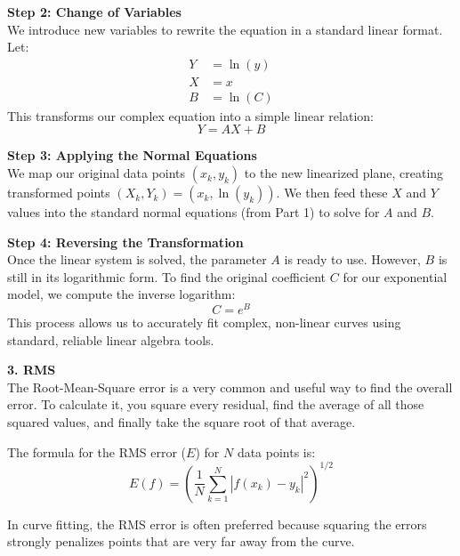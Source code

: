 \vspace{5pt}
\noindent\textbf{Step 2: Change of Variables} \\
We introduce new variables to rewrite the equation in a standard linear format. Let:
\begin{align*}
    Y &= \ln(y) \\
    X &= x \\
    B &= \ln(C)
\end{align*}
This transforms our complex equation into a simple linear relation:
\begin{equation*}
    Y = AX + B
\end{equation*}

\vspace{5pt}
\noindent\textbf{Step 3: Applying the Normal Equations} \\
We map our original data points $(x_k, y_k)$ to the new linearized plane, creating transformed points $(X_k, Y_k) = (x_k, \ln(y_k))$. We then feed these $X$ and $Y$ values into the standard normal equations (from Part 1) to solve for $A$ and $B$.

\vspace{5pt}
\noindent\textbf{Step 4: Reversing the Transformation} \\
Once the linear system is solved, the parameter $A$ is ready to use. However, $B$ is still in its logarithmic form. To find the original coefficient $C$ for our exponential model, we compute the inverse logarithm:
\begin{equation*}
    C = e^B
\end{equation*}
This process allows us to accurately fit complex, non-linear curves using standard, reliable linear algebra tools.

\vspace{5pt}
\noindent\textbf{3. RMS} \cite[page 253]{MathewsFink2003} \\
The Root-Mean-Square error is a very common and useful way to find the overall error. To calculate it, you square every residual, find the average of all those squared values, and finally take the square root of that average.

The formula for the RMS error ($E$) for $N$ data points is:
\begin{equation}
    E(f) = \left( \frac{1}{N} \sum_{k=1}^{N} |f(x_k) - y_k|^2 \right)^{1/2}
\end{equation}

In curve fitting, the RMS error is often preferred because squaring the errors strongly penalizes points that are very far away from the curve.

